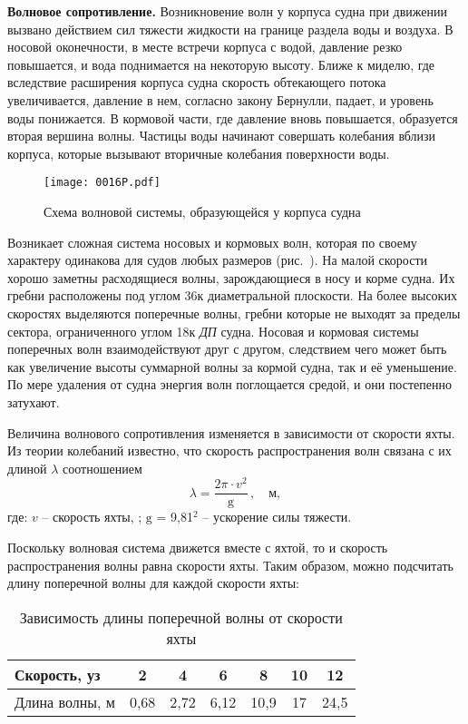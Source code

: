 \textbf{Волновое сопротивление.}
Возникновение волн у корпуса судна при движении вызвано действием сил
тяжести жидкости на границе раздела воды и воздуха. В носовой
оконечности, в месте встречи корпуса с водой, давление резко
повышается, и вода поднимается на некоторую высоту. Ближе к миделю,
где вследствие расширения корпуса судна скорость обтекающего потока
увеличивается, давление в нем, согласно закону Бернулли, падает, и
уровень воды понижается. В кормовой части, где давление вновь
повышается, образуется вторая вершина волны. Частицы воды начинают
совершать колебания вблизи корпуса, которые вызывают вторичные
колебания поверхности воды.

\begin{figure*}[!htb]
  \centering
  \texttt{[image: 0016P.pdf]}
  \caption{Схема волновой системы, образующейся у корпуса судна}
  \label{fig:16}
\end{figure*}

Возникает сложная система носовых и кормовых волн, которая по своему
характеру одинакова для судов любых размеров (рис.~). На малой
скорости хорошо заметны расходящиеся волны, зарождающиеся в носу и
корме судна. Их гребни расположены под углом 36\gr к
диаметральной плоскости. На более высоких скоростях выделяются
поперечные волны, гребни которые не выходят за пределы сектора,
ограниченного углом 18\gr к \textit{ДП} судна. Носовая и
кормовая системы поперечных волн взаимодействуют друг с другом,
следствием чего может быть как увеличение высоты суммарной волны за
кормой судна, так и её уменьшение. По мере удаления от судна энергия
волн поглощается средой, и они постепенно затухают.

Величина волнового сопротивления изменяется в зависимости от скорости
яхты. Из теории колебаний известно, что скорость распространения волн
связана с их длиной $\lambda$ соотношением
%
\begin{equation}
  \lambda = \frac{2 \pi \cdot v^2}{\mathrm g}\,, \quad \text{м},
\end{equation}
%
где: $v$ \--- скорость яхты, \speedms; $\mathrm g$ = 9,81\speedms$^2$ \--- ускорение силы тяжести. 

Поскольку волновая система движется вместе с яхтой, то и скорость
распространения волны равна скорости яхты. Таким образом, можно
подсчитать длину поперечной волны для каждой скорости яхты:

\begin{table}[htb]
  \footnotesize
  \centering
  \begin{tabularx}{\linewidth}{X|c|c|c|c|c|c}
    \toprule
    Скорость, уз & 2 & 4 & 6 & 8 & 10 & 12 \\
    \midrule
    Длина волны, м & 0,68 & 2,72 & 6,12 & 10,9 & 17 & 24,5 \\
    \bottomrule
  \end{tabularx}
  \caption{Зависимость длины поперечной волны от скорости яхты}
  \label{tab:1-2}
\end{table}

